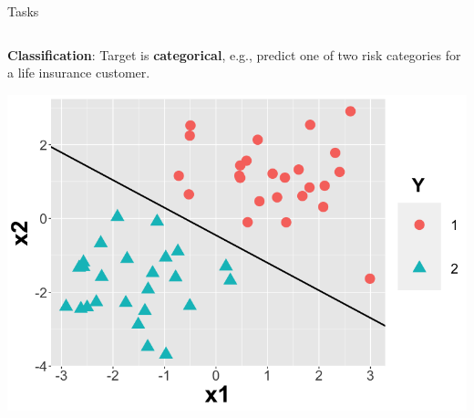 \documentclass[11pt,compress,t,notes=noshow, xcolor=table]{beamer}
\begin{document}
\begin{vbframe}{Tasks}
\begin{columns}
\begin{column}{0.4\textwidth} 
\small \textbf{Classification}: Target is \textbf{categorical}, e.g., predict one of two risk categories for a life insurance customer. 
  
  \begin{center}
    \includegraphics[width=\textwidth]{slides/ml-basics/figure/nutshell-ml-basics-supervised-classification-task.png} 
  \end{center}
\end{column}    
\end{columns}    

\end{vbframe}
\end{document}
